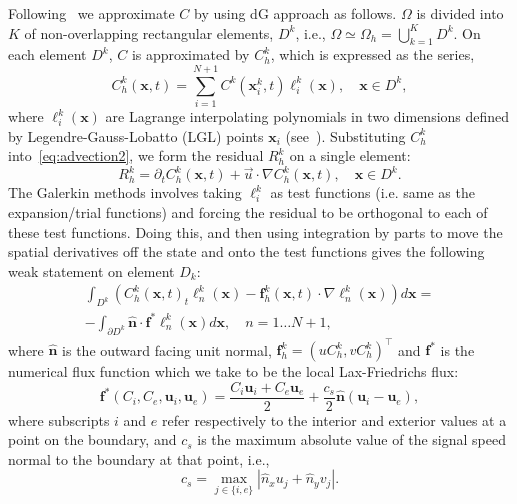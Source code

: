 \documentclass[onecolumn, 12pt, conference]{ieeeconf}
\renewcommand{\u}{\vec{u}}
\begin{document}
Following~\cite{Hesthaven_dGNodal_2008} we approximate $C$ by using dG approach as follows. $\Omega$ is divided into $K$ of non-overlapping rectangular elements, $D^k$, i.e., $\Omega \simeq \Omega_h = \bigcup\limits_{k=1}^{K} D^k$. On each element $D^k$, $C$ is approximated by $C_h^k$, which is expressed as the series,
\begin{equation}
\label{eq:seriesDG}
C_h^k(\bm{x},t)= \sum_{i=1}^{N+1} C^k(\bm{x}_i^k,t) \ell_i^k(\bm{x}), \quad \bm{x} \in D^k,
\end{equation}
where $\ell_i^k(\bm{x})$ are Lagrange interpolating polynomials in two dimensions defined by Legendre-Gauss-Lobatto (LGL) points $\bm{x}_i$ (see~\cite{Hesthaven_dGNodal_2008}). Substituting $C_h^k$ into~\eqref{eq:advection2}, we form the residual $R_h^k$ on a single element:
\begin{equation}
\label{eq:residual}
R_h^k = \partial_t C_h^k(\bm{x},t)+ \u \cdot \nabla C_h^k(\bm{x},t), \quad \bm{x} \in D^k.
\end{equation}
The Galerkin methods involves taking $\ell_i^k$ as test functions (i.e. same as the expansion/trial functions) and forcing the residual to be orthogonal to each of these test functions. Doing this, and then using integration by parts to move the spatial derivatives off the state and onto the test functions gives the following weak statement on element $D_k$:
\begin{equation}
\label{eq:weakStatement}
\begin{split}
\int_{D^k}  \left( C_h^k(\bm{x},t)_t \ell_n^k(\bm{x}) - \bm{f}_h^k(\bm{x},t) \cdot \nabla \ell_n^k(\bm{x}) \right)  d\bm{x} = \\
-\int_{\partial D^k} \bm{\hat{n}}\cdot \bm{f}^* \ell_n^k(\bm{x}) d\bm{x} , \quad n=1 \ldots N+1,
\end{split}
\end{equation}
where $\bm{\hat{n}}$ is the outward facing unit normal, $\bm{f}_h^k=(uC_h^k,vC_h^k)^\top$ and $\bm{f}^*$ is the numerical flux function which we take to be the local Lax-Friedrichs flux:
\begin{equation}
\label{eq:LF}
\bm{f}^*(C_i,C_e,\bm{u}_i,\bm{u}_e) = \frac{C_i \bm{u}_i + C_e \bm{u}_e }{2}+\frac{c_s}{2}\bm{\hat{n}}(\bm{u}_i-\bm{u}_e),
\end{equation}
where subscripts $i$ and $e$ refer respectively to the interior and exterior values at a point on the boundary, and $c_s$ is the maximum absolute value of the signal speed normal to the boundary at that point, i.e.,
\begin{equation}
\label{eq:LFconst}
c_s=\max_{j\in\{i,e\}} | \hat n_x u_j + \hat n_y v_j |.
\end{equation}
\end{document}
